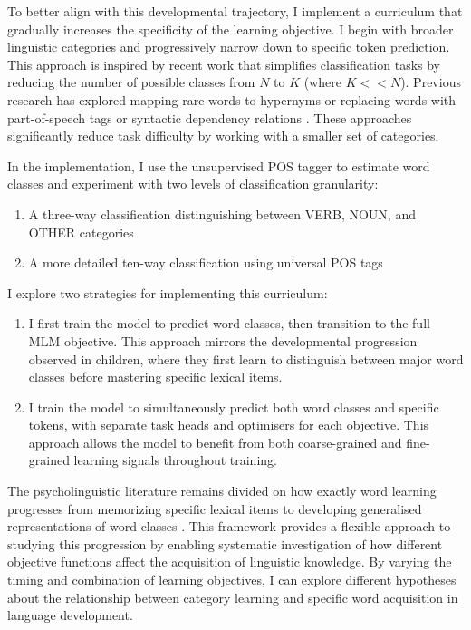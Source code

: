 To better align with this developmental trajectory, I implement a curriculum that gradually increases the specificity of the learning objective. I begin with broader linguistic categories and progressively narrow down to specific token prediction. This approach is inspired by recent work that simplifies classification tasks by reducing the number of possible classes from $N$ to $K$ (where $K << N$). Previous research has explored mapping rare words to hypernyms \citep{bai2022better} or replacing words with part-of-speech tags \citep{wang2023language} or syntactic dependency relations \citep{cui2022lert}. These approaches significantly reduce task difficulty by working with a smaller set of categories.

In the implementation, I use the unsupervised POS tagger to estimate word classes and experiment with two levels of classification granularity:
\begin{enumerate}
    \item A three-way classification distinguishing between VERB, NOUN, and OTHER categories
    \item A more detailed ten-way classification using universal POS tags
\end{enumerate}

I explore two strategies for implementing this curriculum:

\begin{enumerate}
    \item {} I first train the model to predict word classes, then transition to the full MLM objective. This approach mirrors the developmental progression observed in children, where they first learn to distinguish between major word classes before mastering specific lexical items.
    
    \item {} I train the model to simultaneously predict both word classes and specific tokens, with separate task heads and optimisers for each objective. This approach allows the model to benefit from both coarse-grained and fine-grained learning signals throughout training.
\end{enumerate}

The psycholinguistic literature remains divided on how exactly word learning progresses from memorizing specific lexical items to developing generalised representations of word classes \citep{clark2015first}. This framework provides a flexible approach to studying this progression by enabling systematic investigation of how different objective functions affect the acquisition of linguistic knowledge. By varying the timing and combination of learning objectives, I can explore different hypotheses about the relationship between category learning and specific word acquisition in language development.

